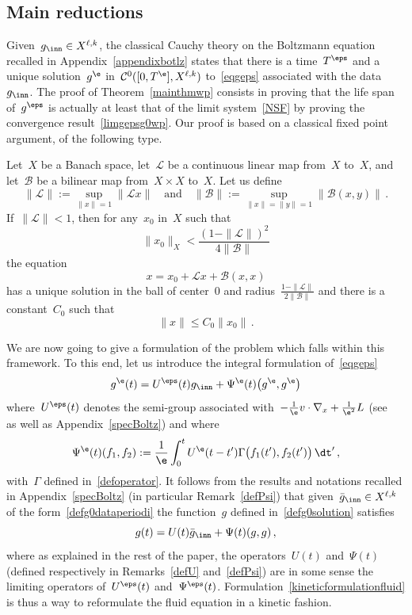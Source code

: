 \subsection{Main reductions}
Given~$g_{\inn} \in X^{{\ell},k}$, the classical Cauchy theory on the Boltzmann equation recalled in Appendix~\ref{appendixbotlz} states that there is a time~$T^\eps$ and a unique solution~$g^\e $ in~$ \mathcal{C}^0([0,T^\e],X^{{\ell},k})$ to~\eqref{eqgeps} associated with the data~$g_{\inn}$. The proof of Theorem~\ref{mainthmwp} consists in proving that the life span of~$g^\eps$ is actually at least that of the limit system~\eqref{NSF} by proving the convergence result~\eqref{limgepsg0wp}. Our proof is based on a classical fixed point argument, of the following type.
\begin{lemm}\label{cacciopoli+}
Let~$X$ be a Banach space, let~${\mathcal L}$ be a continuous linear map from~$X$ to~$X$, and let~${\mathcal B}$ be a bilinear map from~$X\times X$ to~$X$. Let us define
\[
\|{\mathcal L}\| := \sup_{\|x\|=1} \|{\mathcal L}x\|\quad\text{and}\quad
\|{\mathcal B}\| := \sup_{\|x\|=\|y\|=1} \|{\mathcal B}(x,y)\| \,.
\]
If~$\|{\mathcal L}\| <1$, then for any~$x_{0}$ in~$X$ such that
\[
\|x_{0}\|_{X}< \frac{(1-\|{\mathcal L}\|)^2} {4\|{\mathcal B}\| }
\]
the equation
\[
x=x_{0}+{\mathcal L}x+{\mathcal B}(x,x)
\]
has a unique solution in the ball of center~$0$ and radius~$\frac {1-\|{\mathcal L}\| }{2\|{\mathcal B}\|} $ and there is a constant~$C_0$ such that
\[
\|x\|\le C _0\|x_0\| \,.
\]
\end{lemm}

We are now going to give a formulation of the problem which falls within this framework. To this end, let us introduce the integral formulation of~\eqref{eqgeps}
\begin{equation}\label{integralformulation}
g^\e(t) =U^\eps(t) g _{\inn} + \Psi^\e(t) \big(g^\e,g^\e\big)
\end{equation}
where~$U^\eps(t) $ denotes the semi-group associated with~$- \frac1\e v \cdot\nabla_x + \frac1{\e^2} L $ (see~\cite{Bardos-Ukai, Ukai} as well as Appendix~\ref{specBoltz}) and where
\begin{equation}\label{defPsiepsh1h2}
\Psi^\e(t) (f_1,f_2) :=\frac1\e \int_0^t U^\e (t-t') \Gamma \big(f_1(t'),f_2(t')\big) \, \dt' \,,
\end{equation}
with~$\Gamma$ defined in~\eqref{defoperator}. It follows from the results and notations recalled in Appendix~\ref{specBoltz} (in particular Remark~\ref{defPsi}) that given~$\bar g_{\inn} \in X^{{\ell},k}$ of the form~\eqref{defg0dataperiodi} the function~$g$ defined in~\eqref{defg0solution} satisfies
\begin{equation}\label{kineticformulationfluid}
g(t) =U (t)\bar g_{\inn} + \Psi(t) (g,g) \,,
\end{equation}
where as explained in the rest of the paper, the operators~$U (t)$ and~$ \Psi(t)$ (defined respectively in Remarks~\ref{defU} and~\ref{defPsi}) are in some sense the limiting operators of~$U^\eps (t)$ and~$ \Psi^\eps(t)$. Formulation~\eqref{kineticformulationfluid} is thus a way to reformulate the fluid equation in a kinetic fashion.


